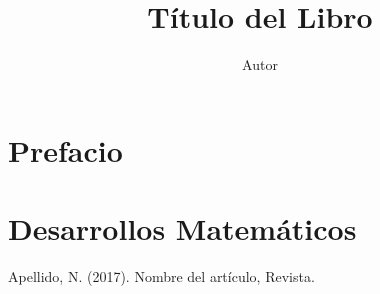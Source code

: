 \documentclass[11pt,a4paper,twoside,openright]{book}
\author{Autor}
\title{Título del Libro}
\begin{document}
\frontmatter

\maketitle

\tableofcontents{}

\chapter{Prefacio}


\mainmatter






\appendix
\chapter{Desarrollos Matemáticos}

\backmatter



\begin{thebibliography}{3}
 Apellido, N. (2017). Nombre del artículo, Revista.
\end{thebibliography}
\end{document}
